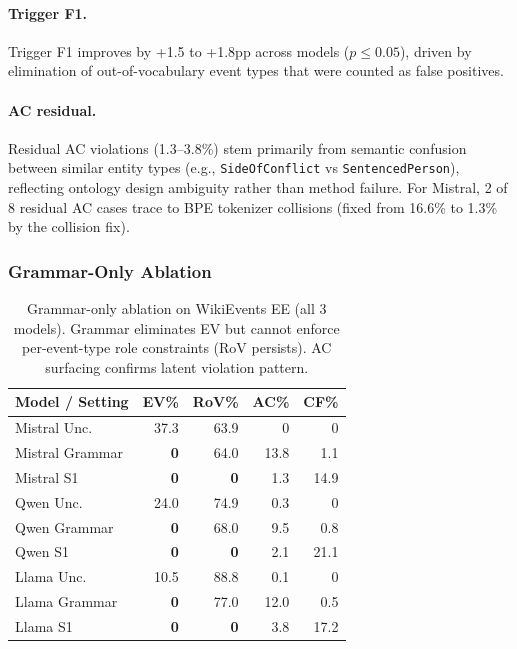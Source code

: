 \documentclass[11pt]{article}
\begin{document}
\paragraph{Trigger F1.}
Trigger F1 improves by +1.5 to +1.8pp across models ($p \leq 0.05$), driven by elimination of out-of-vocabulary event types that were counted as false positives.

\paragraph{AC residual.}
Residual AC violations (1.3--3.8\%) stem primarily from semantic confusion between similar entity types (e.g., \texttt{SideOfConflict} vs \texttt{SentencedPerson}), reflecting ontology design ambiguity rather than method failure.
For Mistral, 2 of 8 residual AC cases trace to BPE tokenizer collisions (fixed from 16.6\% to 1.3\% by the collision fix).

\subsubsection{Grammar-Only Ablation}
\label{sec:grammar_ablation}

\begin{table}[t]
\centering
\caption{Grammar-only ablation on WikiEvents EE (all 3 models). Grammar eliminates EV but cannot enforce per-event-type role constraints (RoV persists). AC surfacing confirms latent violation pattern.}
\label{tab:grammar_ablation}
\small
\begin{tabular}{l rrrr}
\toprule
\textbf{Model / Setting} & \textbf{EV\%} & \textbf{RoV\%} & \textbf{AC\%} & \textbf{CF\%} \\
\midrule
Mistral Unc. & 37.3 & 63.9 & 0 & 0 \\
Mistral Grammar & \textbf{0} & 64.0 & 13.8 & 1.1 \\
Mistral S1 & \textbf{0} & \textbf{0} & 1.3 & 14.9 \\
\midrule
Qwen Unc. & 24.0 & 74.9 & 0.3 & 0 \\
Qwen Grammar & \textbf{0} & 68.0 & 9.5 & 0.8 \\
Qwen S1 & \textbf{0} & \textbf{0} & 2.1 & 21.1 \\
\midrule
Llama Unc. & 10.5 & 88.8 & 0.1 & 0 \\
Llama Grammar & \textbf{0} & 77.0 & 12.0 & 0.5 \\
Llama S1 & \textbf{0} & \textbf{0} & 3.8 & 17.2 \\
\bottomrule
\end{tabular}
\end{table}
\end{document}
